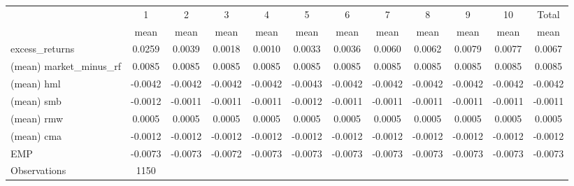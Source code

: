 \begin{tabular}{l*{11}{c}}
\hline\hline
                    &           1&           2&           3&           4&           5&           6&           7&           8&           9&          10&       Total\\
                    &        mean&        mean&        mean&        mean&        mean&        mean&        mean&        mean&        mean&        mean&        mean\\
\hline
excess\_returns      &      0.0259&      0.0039&      0.0018&      0.0010&      0.0033&      0.0036&      0.0060&      0.0062&      0.0079&      0.0077&      0.0067\\
(mean) market\_minus\_rf&      0.0085&      0.0085&      0.0085&      0.0085&      0.0085&      0.0085&      0.0085&      0.0085&      0.0085&      0.0085&      0.0085\\
(mean) hml          &     -0.0042&     -0.0042&     -0.0042&     -0.0042&     -0.0043&     -0.0042&     -0.0042&     -0.0042&     -0.0042&     -0.0042&     -0.0042\\
(mean) smb          &     -0.0012&     -0.0011&     -0.0011&     -0.0011&     -0.0012&     -0.0011&     -0.0011&     -0.0011&     -0.0011&     -0.0011&     -0.0011\\
(mean) rmw          &      0.0005&      0.0005&      0.0005&      0.0005&      0.0005&      0.0005&      0.0005&      0.0005&      0.0005&      0.0005&      0.0005\\
(mean) cma          &     -0.0012&     -0.0012&     -0.0012&     -0.0012&     -0.0012&     -0.0012&     -0.0012&     -0.0012&     -0.0012&     -0.0012&     -0.0012\\
EMP                 &     -0.0073&     -0.0073&     -0.0072&     -0.0073&     -0.0073&     -0.0073&     -0.0073&     -0.0073&     -0.0073&     -0.0073&     -0.0073\\
\hline
Observations        &        1150&            &            &            &            &            &            &            &            &            &            \\
\hline\hline
\end{tabular}
